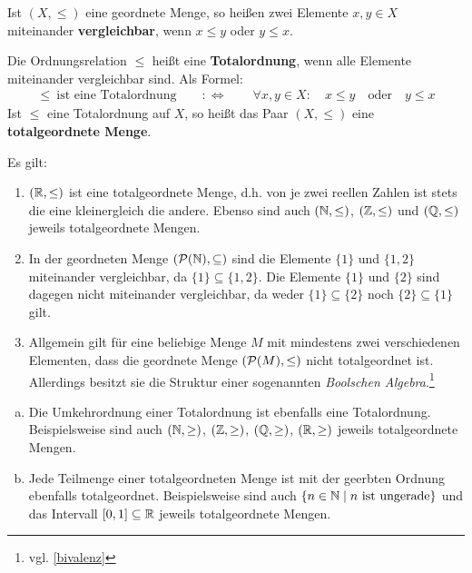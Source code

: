 \begin{defin}[Vergleichbarkeit] \label{def:totalordnung}  
    Ist $(X,\le)$ eine geordnete Menge, so heißen zwei Elemente $x,y\in X$ miteinander \textbf{vergleichbar}, wenn $x\le y$ oder $y\le x$.

    Die Ordnungsrelation $\le$ heißt eine \textbf{Totalordnung}, wenn alle Elemente miteinander vergleichbar sind. Als Formel:
    \begin{align*}
        \le\ \text{ist eine Totalordnung}\qquad:\Leftrightarrow\qquad \forall x,y \in X:\quad x\le y\quad \text{oder}\quad y\le x 
    \end{align*}
    Ist $\le$ eine Totalordnung auf $X$, so heißt das Paar $(X,\le)$ eine \textbf{totalgeordnete Menge}.
\end{defin}


\begin{bsp}
    Es gilt:
    \begin{enumerate}
        \item $(\mathbb R,\le)$ ist eine totalgeordnete Menge, d.h. von je zwei reellen Zahlen ist stets die eine kleinergleich die andere. Ebenso sind auch $(\mathbb N,\le)$, $(\mathbb Z,\le)$ und $(\mathbb Q,\le)$ jeweils totalgeordnete Mengen.
        \item In der geordneten Menge $(\mathcal P(\mathbb N),\subseteq)$ sind die Elemente $\{1\}$ und $\{1,2\}$ miteinander vergleichbar, da $\{1\}\subseteq \{1,2\}$. Die Elemente $\{1\}$ und $\{2\}$ sind dagegen nicht miteinander vergleichbar, da weder $\{1\}\subseteq\{2\}$ noch $\{2\}\subseteq \{1\}$ gilt.
        \item Allgemein gilt für eine beliebige Menge $M$ mit mindestens zwei verschiedenen Elementen, dass die geordnete Menge $(\mathcal P(M),\le)$ nicht totalgeordnet ist. Allerdings besitzt sie die Struktur einer sogenannten \emph{Boolschen Algebra}.\footnote{vgl. \cref{bivalenz}}
    \end{enumerate}
\end{bsp}


\begin{bem} \quad
    \begin{enumerate}[a)]
        \item Die Umkehrordnung einer Totalordnung ist ebenfalls eine Totalordnung. Beispielsweise sind auch $(\mathbb N,\ge)$, $(\mathbb Z,\ge)$, $(\mathbb Q,\ge)$, $(\mathbb R,\ge)$ jeweils totalgeordnete Mengen.
        \item Jede Teilmenge einer totalgeordneten Menge ist mit der geerbten Ordnung ebenfalls totalgeordnet. Beispielsweise sind auch $\{n\in \mathbb N\mid n\ \text{ist ungerade}\}$ und das Intervall $[0,1]\subseteq\mathbb R$ jeweils totalgeordnete Mengen.
    \end{enumerate}
\end{bem}


